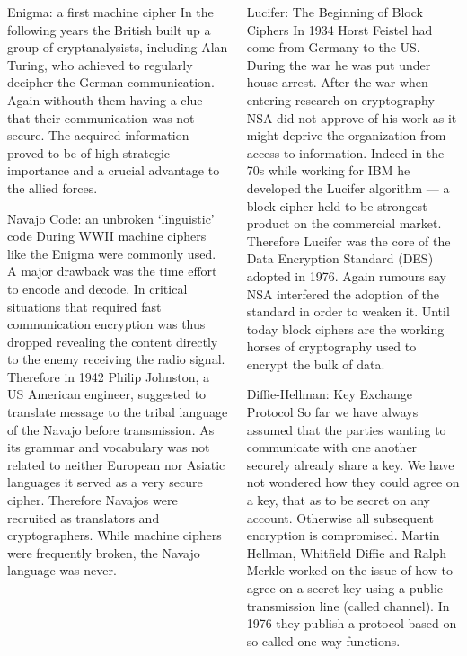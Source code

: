 \documentclass[final,hyperref={pdfpagelabels=false}]{beamer}
\begin{document}
\begin{frame}{}
\begin{columns}[t]
\begin{column}{.3\linewidth}
\begin{block}{Enigma: a first machine cipher}
          In the following years the British built up a group of cryptanalysists, including Alan Turing, who achieved to regularly decipher the German communication. Again withouth them having a clue that their communication was not secure. The acquired information proved to be of high strategic importance and a crucial advantage to the allied forces. 
        \end{block}
        \begin{block}{Navajo Code: an unbroken `linguistic' code}
          During WWII machine ciphers like the Enigma were commonly used. A major drawback was the time effort to encode and decode. In critical situations that required fast communication encryption was thus dropped revealing the content directly to the enemy receiving the radio signal. Therefore in 1942 Philip Johnston, a US American engineer, suggested to translate message to the tribal language of the Navajo before transmission. As its grammar and vocabulary was not related to neither European nor Asiatic languages it served as a very secure cipher. Therefore Navajos were recruited as translators and cryptographers. While machine ciphers were frequently broken, the Navajo language was never.
        \end{block}

    \end{column}
    \begin{column}{.3\linewidth}
        \begin{block}{Lucifer: The Beginning of Block Ciphers}
          In 1934 Horst Feistel had come from Germany to the US. During the war he was put under house arrest. After the war when entering research on cryptography NSA did not approve of his work as it might deprive the organization from access to information. Indeed in the 70s while working for IBM he developed the Lucifer algorithm --- a block cipher held to be strongest product on the commercial market. Therefore Lucifer was the core of the Data Encryption Standard (DES) adopted in 1976. Again rumours say NSA interfered the adoption of the standard in order to weaken it. Until today block ciphers are the working horses of cryptography used to encrypt the bulk of data.
        \end{block}

        \begin{block}{Diffie-Hellman: Key Exchange Protocol}
          So far we have always assumed that the parties wanting to communicate with one another securely already share a key. We have not wondered how they could agree on a key, that as to be secret on any account. Otherwise all subsequent encryption is compromised. Martin Hellman, Whitfield Diffie and Ralph Merkle worked on the issue of how to agree on a secret key using a public transmission line (called channel). In 1976 they publish a protocol based on so-called one-way functions.
        \end{block}


\end{column}
\end{columns}
\end{frame}
\end{document}
